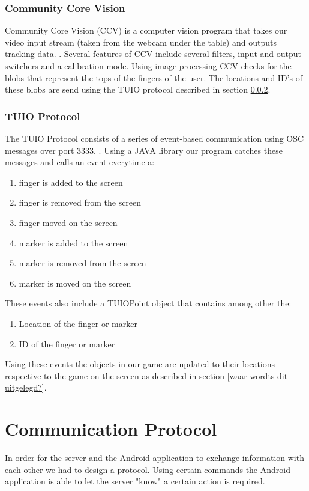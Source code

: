 \documentclass[a4paper,10pt]{article}
\begin{document}
		\subsubsection{Community Core Vision}
		\label{sec:communitycorevision}	
		Community Core Vision (CCV) is a computer vision program that takes our video input stream (taken from the webcam under the table) and outputs tracking data. \cite{ccv}.
		Several features of CCV include several filters, input and output switchers and a calibration mode. 
		Using image processing CCV checks for the blobs that represent the tops of the fingers of the user. 
		The locations and ID's of these blobs are send using the TUIO protocol described in section \ref{sec:tuioprotocol}.
		
		
		\subsubsection{TUIO Protocol}
		\label{sec:tuioprotocol}
		The TUIO Protocol consists of a series of event-based communication using OSC messages over port 3333. \cite{tuioProtocol}. 
		Using a JAVA library our program catches these messages and calls an event everytime a:
		\begin{enumerate}
			\item finger is added to the screen
			\item finger is removed from the screen
			\item finger moved on the screen
			\item marker is added to the screen
			\item marker is removed from the screen
			\item marker is moved on the screen
		\end{enumerate}
		These events also include a TUIOPoint object that contains among other the:
		\begin{enumerate}
			\item Location of the finger or marker
			\item ID of the finger or marker
		\end{enumerate}
		Using these events the objects in our game are updated to their locations respective to the game on the screen as described in section \ref{waar wordts dit uitgelegd?}.

		
\section{Communication Protocol}
\label{sec:communication-protocol}
In order for the server and the Android application to exchange information with each other we had to design a protocol.
Using certain commands the Android application is able to let the server "know" a certain action is required.
\end{document}
